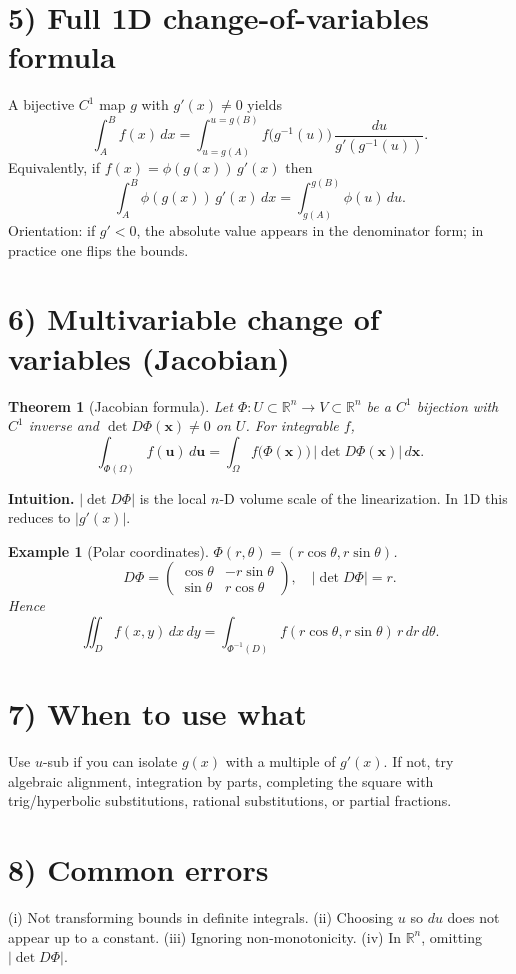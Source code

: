 \documentclass[12pt]{article}
\newtheorem{theorem}{Theorem}
\newtheorem{example}{Example}
\begin{document}
\section*{5) Full 1D change-of-variables formula}
A bijective \(C^1\) map \(g\) with \(g'(x)\neq 0\) yields
\[
\int_{A}^{B} f(x)\,dx
=\int_{u=g(A)}^{u=g(B)} f\!\big(g^{-1}(u)\big)\,\frac{du}{g'\!\left(g^{-1}(u)\right)}.
\]
Equivalently, if \(f(x)=\phi(g(x))\,g'(x)\) then
\[
\int_{A}^{B}\phi(g(x))\,g'(x)\,dx=\int_{g(A)}^{g(B)}\phi(u)\,du.
\]
Orientation: if \(g'<0\), the absolute value appears in the denominator form; in practice one flips the bounds.

\section*{6) Multivariable change of variables (Jacobian)}
\begin{theorem}[Jacobian formula]
Let \(\Phi:U\subset\mathbb R^n\to V\subset\mathbb R^n\) be a \(C^1\) bijection with \(C^1\) inverse and \(\det D\Phi(\mathbf x)\neq 0\) on \(U\). For integrable \(f\),
\[
\int_{\Phi(\Omega)} f(\mathbf u)\,d\mathbf u
=\int_{\Omega} f\big(\Phi(\mathbf x)\big)\,\big|\det D\Phi(\mathbf x)\big|\,d\mathbf x.
\]
\end{theorem}

\noindent\textbf{Intuition.} \(|\det D\Phi|\) is the local \(n\)-D volume scale of the linearization. In 1D this reduces to \(|g'(x)|\).

\begin{example}[Polar coordinates]
\(\Phi(r,\theta)=(r\cos\theta,r\sin\theta)\).
\[
D\Phi=\begin{pmatrix}\cos\theta & -r\sin\theta\\ \sin\theta & r\cos\theta\end{pmatrix},
\quad |\det D\Phi|=r.
\]
Hence
\[
\iint_{D} f(x,y)\,dx\,dy=\int_{\Phi^{-1}(D)} f(r\cos\theta,r\sin\theta)\,r\,dr\,d\theta.
\]
\end{example}

\section*{7) When to use what}
Use \(u\)-sub if you can isolate \(g(x)\) with a multiple of \(g'(x)\). If not, try algebraic alignment, integration by parts, completing the square with trig/hyperbolic substitutions, rational substitutions, or partial fractions.

\section*{8) Common errors}
(i) Not transforming bounds in definite integrals. \;
(ii) Choosing \(u\) so \(du\) does not appear up to a constant. \;
(iii) Ignoring non-monotonicity. \;
(iv) In \(\mathbb R^n\), omitting \(|\det D\Phi|\).
\end{document}
